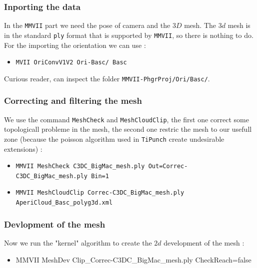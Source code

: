 \subsubsection{Inporting the data}

In the {\tt MMVII} part we need the pose of camera and the $3D$ mesh. The $3d$ mesh is 
in the standard  {\tt ply} format that is supported by  {\tt MMVII}, so there is nothing
to do. For the importing the orientation  we can use :

\begin{itemize}
	\item {\tt MVII OriConvV1V2 Ori-Basc/ Basc}
\end{itemize}

Curious reader, can inspect the folder {\tt MMVII-PhgrProj/Ori/Basc/}.


\subsubsection{Correcting and filtering the mesh}

We use the command {\tt MeshCheck} and {\tt MeshCloudClip}, the first one
correct some topologicall probleme in the mesh, the second one restric
the mesh to our usefull zone  (because the poisson algorithm used in {\tt TiPunch}
create undesirable extensions) :

\begin{itemize}
	\item {\tt MMVII  MeshCheck C3DC\_BigMac\_mesh.ply Out=Correc-C3DC\_BigMac\_mesh.ply Bin=1}

	\item {\tt MMVII  MeshCloudClip Correc-C3DC\_BigMac\_mesh.ply  AperiCloud\_Basc\_polyg3d.xml}
\end{itemize}


\subsubsection{Devlopment of the mesh}

Now we run the "kernel" algorithm to create the $2d$ development of the mesh :

\begin{itemize}
    \item {MMVII MeshDev Clip\_Correc-C3DC\_BigMac\_mesh.ply CheckReach=false}
\end{itemize}

